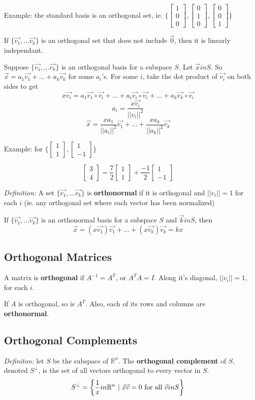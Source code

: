 \documentclass[12pt]{article}
\newcommand{\R}[1]{\mathbb{R}^{#1}}
\newcommand{\vectwo}[2]{\begin{bmatrix}#1\\#2\end{bmatrix}}
\newcommand{\vecthree}[3]{\begin{bmatrix}#1\\#2\\#3\end{bmatrix}}
\begin{document}
Example: the standard basis is an orthogonal set, ie. $\bigg\{\vecthree{1}{0}{0}, \vecthree{0}{1}{0}, \vecthree{0}{0}{1}\bigg\}$

If $\{\vec{v_1},\dots \vec{v_k}\}$ is an orthogonal set that does not include $\vec{0}$, then it is linearly independant.

Suppose $\{\vec{v_1},\dots \vec{v_k}\}$ is an orthogonal basis for a subspace $S$. Let $\vec{x}in S$. So $\vec{x} = a_1\vec{v_1} + \dots + a_k\vec{v_k}$ for some $a_i$'s. For some $i$, take the dot product of $\vec{v_i}$ on both sides to get \[ x\vec{v_i} = a_1\vec{v_1}\circ\vec{v_i} + \dots + a_i\vec{v_i}\circ\vec{v_i} + \dots + a_k\vec{v_k}\circ\vec{v_i} \] \[ a_i = \frac{x\vec{v_i}}{{||v_i||}^2} \] \[ \vec{x} = \frac{xa_1}{{||a_i||}^2}\vec{v_1} + \dots + \frac{xa_k}{{||a_k||}^2}\vec{v_k} \]

Example: for $\bigg\{\vectwo{1}{1},\vectwo{1}{-1}\bigg\}$

\[ \vectwo{3}{4} = \frac{7}{2}\vectwo{1}{1} + \frac{-1}{2}\vectwo{1}{-1} \]

\textit{Definition:} A set $\{\vec{v_1}, \dots \vec{v_k}\}$ is {\bf orthonormal} if it is orthogonal and ${||v_i||} = 1$ for each $i$ (ie. any orthogonal set where each vector has been normalized)

\begin{theorem}If $\{\vec{v_1},\dots \vec{v_k}\}$ is an orthonormal basis for a subspace $S$ and $\vec{k}in S$, then \[ \vec{x} = (x\vec{v_1})\vec{v_1} + \dots + (x\vec{v_k})\vec{v_k} = kx \]
\end{theorem}

\subsection*{Orthogonal Matrices}
A matrix is {\bf orthogonal} if $A^{-1} = A^T$, or $A^TA = I$. Along it's diagonal, ${||v_i||} = 1$, for each $i$.

If $A$ is orthogonal, so is $A^T$. Also, each of its rows and columns are {\bf orthonormal}.


\subsection*{Orthogonal Complements}
\textit{Definiton:} let $S$ be the subspace of $\R{n}$. The {\bf orthogonal complement} of $S$, denoted $S^\perp$, is the set of all vectors orthogonal to every vector in $S$. \[ S^\perp = \bigg\{\frac{1}{x}in\R{n}\suchthat \vec{x}\vec{v} = 0 \text{ for all } \vec{v}in S\bigg\} \]
\end{document}
